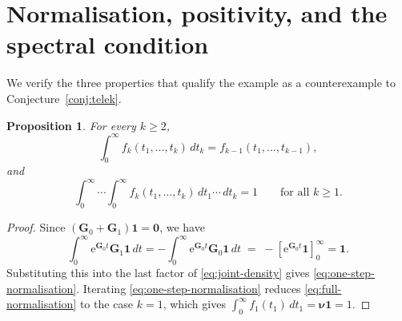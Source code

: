 \documentclass[11pt]{article}
\newtheorem{proposition}[theorem]{Proposition}
\theoremstyle{definition}
\theoremstyle{remark}
\newcommand{\e}{\mathrm{e}}
\newcommand{\bzero}{\bm{0}}
\begin{document}
\section{Normalisation, positivity, and the spectral condition}\label{sec:verification}


We verify the three properties that qualify the example as a counterexample to Conjecture~\ref{conj:telek}.

\begin{proposition}\label{prop:normalisation}
For every $k\ge 2$,
\begin{equation}\label{eq:one-step-normalisation}
\int_0^{\infty} f_k(t_1,\dots,t_k)\,dt_k
=
 f_{k-1}(t_1,\dots,t_{k-1}),
\end{equation}
and
\begin{equation}\label{eq:full-normalisation}
\int_0^\infty\cdots \int_0^\infty f_k(t_1,\dots,t_k)
\,dt_1\cdots \,dt_k=1
\qquad\text{for all }k\ge 1.
\end{equation}
\end{proposition}

\begin{proof}
Since $(\bm{G}_0+\bm{G}_1)\bm{1}=\bzero$, we have
\[
\int_0^\infty \e^{\bm{G}_0t}\bm{G}_1\bm{1}\,dt
=
-\int_0^\infty \e^{\bm{G}_0t}\bm{G}_0\bm{1}\,dt
\;=\; -\left[\e^{\bm{G}_0t}\bm{1}\right]_0^\infty
=
\bm{1}.
\]
Substituting this into the last factor of \eqref{eq:joint-density} gives \eqref{eq:one-step-normalisation}. Iterating \eqref{eq:one-step-normalisation} reduces \eqref{eq:full-normalisation} to the case $k=1$, which gives $\int_0^\infty f_1(t_1)\,dt_1=\bm{\nu}\bm{1}=1$.
\end{proof}
\end{document}
